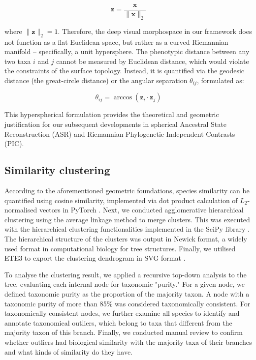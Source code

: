 $$\mathbf{z} = \frac{\mathbf{x}}{\|\mathbf{x}\|_2}$$

where $\|\mathbf{z}\|_2 = 1$. 
Therefore, the deep visual morphospace in our framework does not function as a flat Euclidean space, 
but rather as a curved Riemannian manifold -- specifically, a unit hypersphere. 
The phenotypic distance between any two taxa $i$ and $j$ cannot be measured by Euclidean distance, which would violate the constraints of the surface topology. 
Instead, it is quantified via the geodesic distance (the great-circle distance) or the angular separation $\theta_{ij}$, formulated as:

$$\theta_{ij} = \arccos(\mathbf{z}_i \cdot \mathbf{z}_j)$$

This hyperspherical formulation provides the theoretical and geometric justification for our subsequent developments in spherical 
Ancestral State Reconstruction (ASR) and Riemannian Phylogenetic Independent Contrasts (PIC). 

\subsection{Similarity clustering}\label{subsec:mm-similarity-clustering}

According to the aforementioned geometric foundations, species similarity can be quantified using cosine similarity, implemented via
dot product calculation of $L_2$-normalised vectors in PyTorch \parencite{Ansel2024Pytorch}.
Next, we conducted agglomerative hierarchical clustering using the average
linkage method to merge clusters. This was executed with the
hierarchical clustering functionalities implemented in the SciPy
library \parencite{Gommers2025Scipy}. The hierarchical structure of the
clusters was output in Newick format, a widely used format in
computational biology for tree structures. Finally, we utilised ETE3
to export the clustering dendrogram in SVG format \parencite{Huerta2016ETE}.

To analyse the clustering result, we applied a recursive top-down
analysis to the tree, evaluating each internal node for taxonomic
"purity." For a given node, we defined taxonomic purity as
the proportion of the majority taxon. A node with a taxonomic
purity of more than 85\% was considered taxonomically consistent. For
taxonomically consistent nodes, we further examine
all species to identify and annotate taxonomical outliers, which belong
to taxa that different from the majority taxon of this branch.
Finally, we conducted manual review to confirm whether outliers had
biological similarity with the majority taxa of their branches and
what kinds of similarity do they have. 

